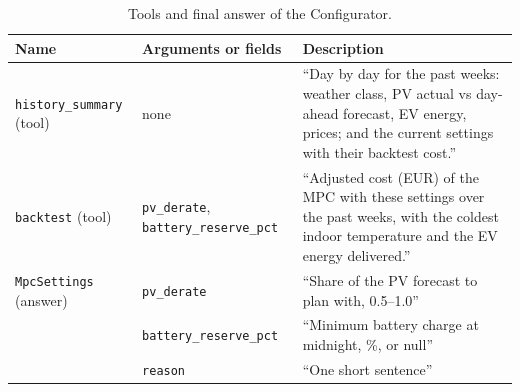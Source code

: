 \documentclass[12pt,a4paper]{report}
\begin{document}
\begin{table}[htbp]
\caption{Tools and final answer of the Configurator.}
\label{tab:schemaconfig}
\small
\begin{tabularx}{\textwidth}{@{}>{\raggedright\arraybackslash}p{3.4cm}>{\raggedright\arraybackslash}p{3.6cm}X@{}}
\toprule
Name & Arguments or fields & Description \\
\midrule
\texttt{history\_summary} (tool) & none & ``Day by day for the past weeks: weather class, PV actual vs day-ahead forecast, EV energy, prices; and the current settings with their backtest cost.'' \\
\texttt{backtest} (tool) & \texttt{pv\_derate}, \texttt{battery\_reserve\_\allowbreak pct} & ``Adjusted cost (EUR) of the MPC with these settings over the past weeks, with the coldest indoor temperature and the EV energy delivered.'' \\
\texttt{MpcSettings} (answer) & \texttt{pv\_derate} & ``Share of the PV forecast to plan with, 0.5--1.0'' \\
 & \texttt{battery\_reserve\_\allowbreak pct} & ``Minimum battery charge at midnight, \%, or null'' \\
 & \texttt{reason} & ``One short sentence'' \\
\bottomrule
\end{tabularx}
\end{table}
\end{document}
